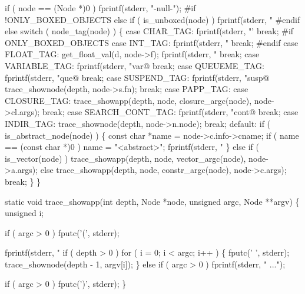     if ( node == (Node *)0 )
        fprintf(stderr, "-null-");
#if !ONLY_BOXED_OBJECTS
    else if ( is_unboxed(node) )
        fprintf(stderr, "%
#endif
    else
        switch ( node_tag(node) )
        \{
        case CHAR_TAG:
            fprintf(stderr, "'%
            break;
#if ONLY_BOXED_OBJECTS
        case INT_TAG:
            fprintf(stderr, "%
            break;
#endif
        case FLOAT_TAG:
            get_float_val(d, node->f);
            fprintf(stderr, "%
            break;
        case VARIABLE_TAG:
            fprintf(stderr, "var@%
            break;
        case QUEUEME_TAG:
            fprintf(stderr, "que@%
            break;
        case SUSPEND_TAG:
            fprintf(stderr, "susp@%
            trace_shownode(depth, node->s.fn);
            break;
        case PAPP_TAG:
        case CLOSURE_TAG:
            trace_showapp(depth, node, closure_argc(node), node->cl.args);
            break;
        case SEARCH_CONT_TAG:
            fprintf(stderr, "cont@%
            break;
        case INDIR_TAG:
            trace_shownode(depth, node->n.node);
            break;
        default:
            if ( is_abstract_node(node) )
            \{
                const char *name = node->c.info->cname;
                if ( name == (const char *)0 )
                    name = "<abstract>";
                fprintf(stderr, "%
            \}
            else if ( is_vector(node) )
                trace_showapp(depth, node, vector_argc(node), node->a.args);
            else
                trace_showapp(depth, node, constr_argc(node), node->c.args);
            break;
        \}
\}

static void
trace_showapp(int depth, Node *node, unsigned argc, Node **argv)
\{
    unsigned i;

    if ( argc > 0 )
        fputc('(', stderr);

    fprintf(stderr, "%
    if ( depth > 0 )
        for ( i = 0; i < argc; i++ )
        \{
            fputc(' ', stderr);
            trace_shownode(depth - 1, argv[i]);
        \}
    else if ( argc > 0 )
        fprintf(stderr, " ...");

    if ( argc > 0 )
        fputc(')', stderr);
\}
\nwendcode{}

%
%

